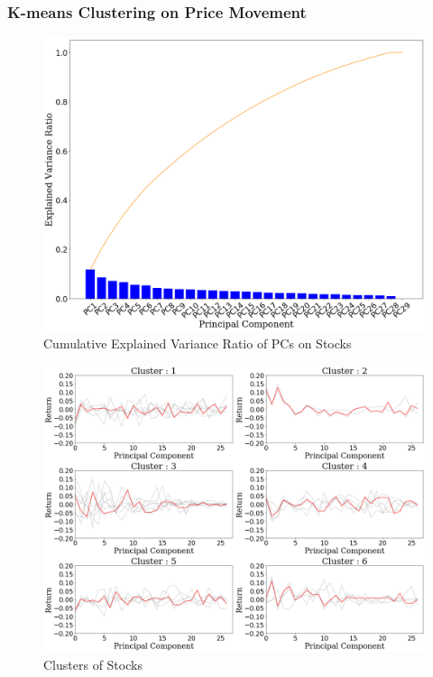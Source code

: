 \documentclass[11pt]{article} %
\theoremstyle{plain}
\theoremstyle{definition}
\begin{document}
\subsubsection{K-means Clustering on Price Movement}

\begin{figure}[ht]
    \includegraphics[width=1\linewidth, center]{resources/stock_pca_explained.png}
    \caption{Cumulative Explained Variance Ratio of PCs on Stocks}
    \label{fig:stockpca}
\end{figure}

\begin{figure}[ht]
    \includegraphics[width=1\linewidth, center]{resources/stock_kmeans.png}
    \caption{Clusters of Stocks}
    \label{fig:stockkmeans}
\end{figure}
\end{document}

